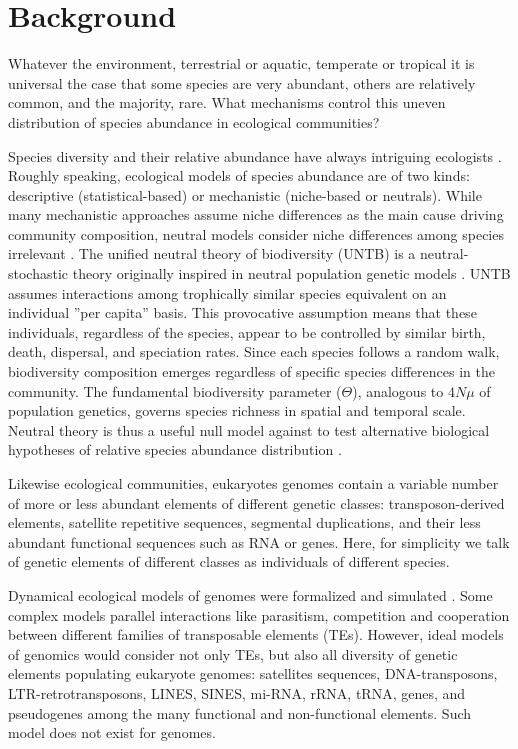 
\section{Background}

Whatever the environment, terrestrial or aquatic, temperate or tropical it is universal the case that some species are very abundant, others are relatively common, and the majority, rare. What mechanisms control this uneven distribution of species abundance in ecological communities?

Species diversity and their relative abundance have always intriguing ecologists \cite{McGill2007}. Roughly speaking, ecological models of species abundance are of two kinds: descriptive (statistical-based) or mechanistic (niche-based or neutrals). While many mechanistic approaches assume niche differences as the main cause driving community composition, neutral models consider niche differences among species irrelevant \cite{Margurran2004}. The unified neutral theory of biodiversity (UNTB) \cite{Hubbell2001,Rosindell2011} is a neutral-stochastic theory originally inspired in neutral population genetic models \cite{Kimura1985,Wright1931}. UNTB assumes interactions among trophically similar species equivalent on an individual ''per capita'' basis. This provocative assumption means that these individuals, regardless of the species, appear to be controlled by similar birth, death, dispersal, and speciation rates. Since each species follows a random walk, biodiversity composition emerges regardless of specific species differences in the community. The fundamental biodiversity parameter ($\Theta$), analogous to $4N\mu$­ of population genetics, governs species richness in spatial and temporal scale. Neutral theory is thus a useful null model against to test alternative biological hypotheses of relative species abundance distribution \cite{Volkov2003,Alonso2006}.

Likewise ecological communities, eukaryotes genomes contain a variable number of more or less abundant elements of different genetic classes: transposon-derived elements, satellite repetitive sequences, segmental duplications, and their less abundant functional sequences such as RNA or genes. Here, for simplicity we talk of genetic elements of different classes as individuals of different species.

Dynamical ecological models of genomes were formalized and simulated \cite{Abrusan2006,Leonardo2002,LeRouzic2007}. Some complex models parallel interactions like parasitism, competition and cooperation between different families of transposable elements (TEs). However, ideal models of genomics would consider not only TEs, but also all diversity of genetic elements populating eukaryote genomes: satellites sequences, DNA-transposons, LTR-retrotransposons, LINES, SINES, mi-RNA, rRNA, tRNA, genes, and pseudogenes among the many functional and non-functional elements. Such model does not exist for genomes.

